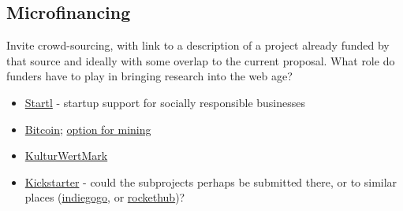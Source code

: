 \documentclass[final,authoryear,3p]{elsarticle-open-drafting}
\begin{document}
\subsection{Microfinancing}
Invite crowd-sourcing, with link to a description of a project already funded by that source and ideally with some overlap to the current proposal. What role do funders have to play in bringing research into the web age?
\begin{itemize}
	\item \href{http://startl.org/}{Startl} - startup support for socially responsible businesses
	\item \href{https://en.bitcoin.it/wiki/Introduction#Preventing_double-spending}{Bitcoin}; \href{http://www.bitcoinplus.com}{option for mining}
	\item \href{http://www.ccc.de/en/updates/2011/kulturwertmark}{KulturWertMark}
	\item \href{http://blog.kickstarter.com/post/5014573685/happy-birthday-kickstarter}{Kickstarter} - could the subprojects perhaps be submitted there, or to similar places (\href{http://www.indiegogo.com/}{indiegogo}, or \href{http://www.rockethub.com/}{rockethub})?

\end{itemize}
\end{document}
